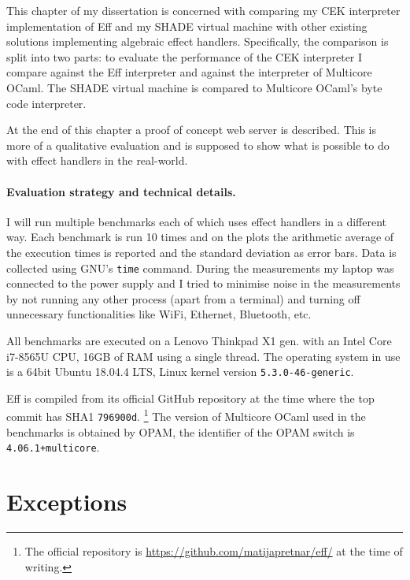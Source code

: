 \documentclass[class=article, crop=false]{standalone}
\begin{document}

This chapter of my dissertation is concerned with comparing my CEK interpreter
implementation of Eff and my SHADE virtual machine with other existing solutions
implementing algebraic effect handlers. Specifically, the comparison is split
into two parts: to evaluate the performance of the CEK interpreter I compare
against the Eff interpreter and against the interpreter of Multicore OCaml.
The SHADE virtual machine is compared to Multicore OCaml's byte code interpreter.

At the end of this chapter a proof of concept web server is described. This is
more of a qualitative evaluation and is supposed to show what is possible to do
with effect handlers in the real-world.

\paragraph{Evaluation strategy and technical details.}

I will run multiple benchmarks each of which uses effect handlers in a different
way. Each benchmark is run 10 times and on the plots the arithmetic average of
the execution times is reported and the standard deviation as error bars. Data is
collected using GNU's \verb|time| command. During the measurements my laptop was
connected to the power supply and I tried to minimise noise in the measurements
by not running any other process (apart from a terminal) and turning off
unnecessary functionalities like WiFi, Ethernet, Bluetooth, etc.

All benchmarks are executed on a Lenovo Thinkpad X1  gen. with an Intel
Core i7-8565U CPU, 16GB of RAM using a single thread. The operating system in
use is a 64bit Ubuntu 18.04.4 LTS, Linux kernel version \verb|5.3.0-46-generic|.

Eff is compiled from its official GitHub repository at the time where the top
commit has SHA1 \verb|796900d|.
\footnote{The official repository is
\url{https://github.com/matijapretnar/eff/} at the time of writing.}
The version of Multicore OCaml used in the benchmarks is obtained by OPAM, the
identifier of the OPAM switch is \verb|4.06.1+multicore|.

\section{Exceptions}
\end{document}
